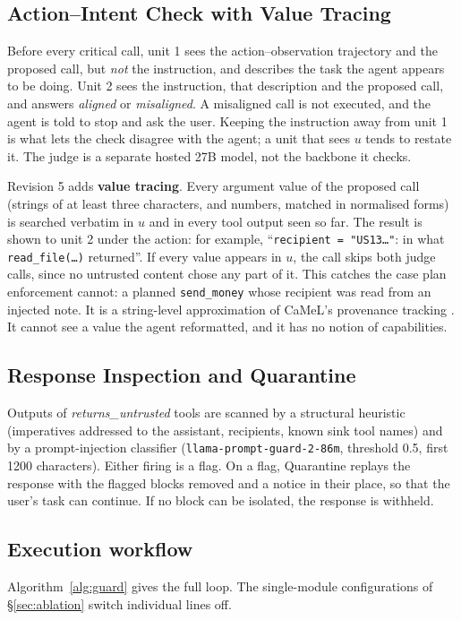 \documentclass[11pt]{article}
\newcommand{\tool}[1]{\texttt{#1}}
\begin{document}
\subsection{Action--Intent Check with Value Tracing}
\label{sec:checkpoint}
Before every critical call, unit 1 sees the action--observation trajectory and the proposed call, but \emph{not} the instruction, and describes the task the agent appears to be doing. Unit 2 sees the instruction, that description and the proposed call, and answers \textit{aligned} or \textit{misaligned}. A misaligned call is not executed, and the agent is told to stop and ask the user. Keeping the instruction away from unit 1 is what lets the check disagree with the agent; a unit that sees $u$ tends to restate it. The judge is a separate hosted 27B model, not the backbone it checks.

Revision 5 adds \textbf{value tracing}. Every argument value of the proposed call (strings of at least three characters, and numbers, matched in normalised forms) is searched verbatim in $u$ and in every tool output seen so far. The result is shown to unit 2 under the action: for example, ``\texttt{recipient = "US13\ldots"}: in what \texttt{read\_file(\ldots)} returned''. If every value appears in $u$, the call skips both judge calls, since no untrusted content chose any part of it. This catches the case plan enforcement cannot: a planned \tool{send\_money} whose recipient was read from an injected note. It is a string-level approximation of CaMeL's provenance tracking \citep{debenedetti2025camel}. It cannot see a value the agent reformatted, and it has no notion of capabilities.

\subsection{Response Inspection and Quarantine}
Outputs of \textit{returns\_untrusted} tools are scanned by a structural heuristic (imperatives addressed to the assistant, recipients, known sink tool names) and by a prompt-injection classifier (\texttt{llama-prompt-guard-2-86m}, threshold 0.5, first 1200 characters). Either firing is a flag. On a flag, Quarantine replays the response with the flagged blocks removed and a notice in their place, so that the user's task can continue. If no block can be isolated, the response is withheld.

\subsection{Execution workflow}
Algorithm~\ref{alg:guard} gives the full loop. The single-module configurations of \S\ref{sec:ablation} switch individual lines off.
\end{document}
